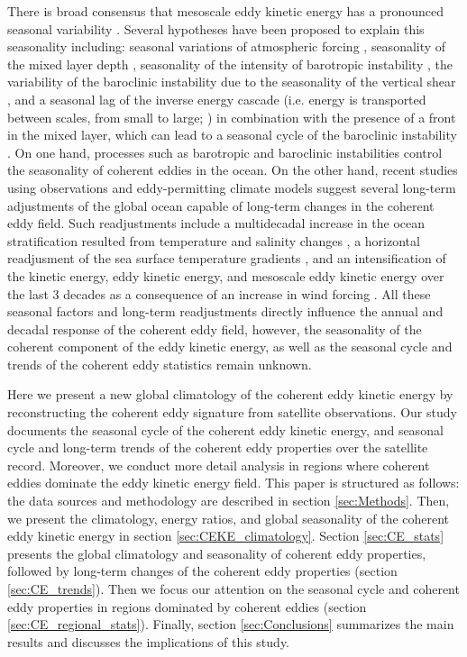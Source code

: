 \documentclass[draft,linenumbers]{agujournal2019}
\begin{document}
There is broad consensus that mesoscale eddy kinetic energy has a pronounced seasonal variability \citep{Uchida_Seasonality_2017,Kang_On_2017,Qiu_seasonal_2004, Qiu_seasonal_1999}. 
Several hypotheses have been proposed to explain this seasonality including: seasonal variations of atmospheric forcing \citep{Sasaki_seasonal_2014}, seasonality of the mixed layer depth \citep{Qiu_seasonal_2014,Callies_season_2015}, seasonality of the intensity of barotropic instability \citep{Qiu_seasonal_2004}, the variability of the baroclinic instability due to the seasonality of the vertical shear \citep{Qiu_seasonal_1999}, and a seasonal lag of the inverse energy cascade (i.e. energy is transported between scales, from small to large; \citealp{Arbic_cascade_2013}) in combination with the presence of a front in the mixed layer, which can lead to a seasonal cycle of the baroclinic instability \citep{Qiu_seasonal_2014}. On one hand, processes such as barotropic and baroclinic instabilities control the seasonality of coherent eddies in the ocean. 
On the other hand, recent studies using observations and eddy-permitting climate models suggest several long-term adjustments of the global ocean capable of long-term changes in the coherent eddy field. 
Such readjustments include a multidecadal increase in the ocean stratification resulted from temperature and salinity changes \citep{Li_stratification_2020}, a horizontal readjusment of the sea surface temperature gradients \citep{Ruela_SST_trends_2020,Bouali_SST_grad_trends_2017,Cane_SST_trends_1997}, and an intensification of the kinetic energy, eddy kinetic energy, and mesoscale eddy kinetic energy over the last 3 decades as a consequence of an increase in wind forcing \citep{Hu_acceleration_2020,Wunsch_speeding_2020,Martinez_Kinetic_2021}. All these seasonal factors and long-term readjustments directly influence the annual and decadal response of the coherent eddy field, however, the seasonality of the coherent component of the eddy kinetic energy, as well as the seasonal cycle and trends of the coherent eddy statistics remain unknown.

Here we present a new global climatology of the coherent eddy kinetic energy by reconstructing the coherent eddy signature from satellite observations. Our study documents the seasonal cycle of the coherent eddy kinetic energy, and seasonal cycle and long-term trends of the coherent eddy properties over the satellite record. 
Moreover, we conduct more detail analysis in regions where coherent eddies dominate the eddy kinetic energy field. 
This paper is structured as follows:  the data sources and methodology are described in section \ref{sec:Methods}.
Then, we present the climatology, energy ratios, and global seasonality of the coherent eddy kinetic energy in section \ref{sec:CEKE_climatology}. 
Section \ref{sec:CE_stats} presents the global climatology and seasonality of coherent eddy properties, followed by long-term changes of the coherent eddy properties (section \ref{sec:CE_trends}). Then we focus our attention on the seasonal cycle and coherent eddy properties in regions dominated by coherent eddies (section \ref{sec:CE_regional_stats}). 
Finally, section \ref{sec:Conclusions} summarizes the main results and discusses the implications of this study.
\end{document}
